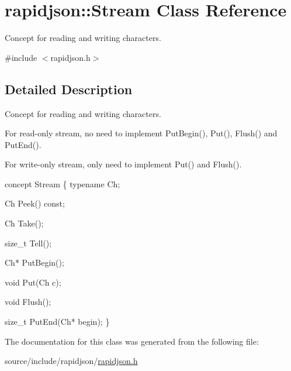 \hypertarget{classrapidjson_1_1_stream}{}\section{rapidjson\+:\+:Stream Class Reference}
\label{classrapidjson_1_1_stream}


Concept for reading and writing characters.  




{\ttfamily \#include $<$rapidjson.\+h$>$}



\subsection{Detailed Description}
Concept for reading and writing characters. 

For read-\/only stream, no need to implement Put\+Begin(), Put(), Flush() and Put\+End().

For write-\/only stream, only need to implement Put() and Flush().


\begin{DoxyCode}
concept Stream \{
    \textcolor{keyword}{typename} Ch;    

    Ch Peek() \textcolor{keyword}{const};

    Ch Take();

    \textcolor{keywordtype}{size\_t} Tell();

    Ch* PutBegin();

    \textcolor{keywordtype}{void} Put(Ch c);

    \textcolor{keywordtype}{void} Flush();

    \textcolor{keywordtype}{size\_t} PutEnd(Ch* begin);
\}
\end{DoxyCode}
 

The documentation for this class was generated from the following file\+:\begin{DoxyCompactItemize}
\item 
source/include/rapidjson/\hyperlink{rapidjson_8h}{rapidjson.\+h}\end{DoxyCompactItemize}
